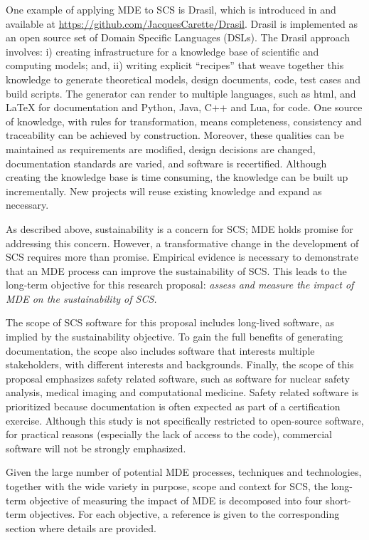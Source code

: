\documentclass[12pt]{article}
\begin{document}
One example of applying MDE to SCS is Drasil, which is introduced in
\citet{SzymczakEtAl2016} and available at
\href{https://github.com/JacquesCarette/Drasil}
{https://github.com/JacquesCarette/Drasil}.  Drasil is implemented as an open
source set of Domain Specific Languages (DSLs).  The Drasil approach involves:
i) creating infrastructure for a knowledge base of scientific and computing
models; and, ii) writing explicit ``recipes'' that weave together this knowledge
to generate theoretical models, design documents, code, test cases and build
scripts. The generator can render to multiple languages, such as html, and LaTeX
for documentation and Python, Java, C++ and Lua, for code. One source of
knowledge, with rules for transformation, means completeness, consistency and
traceability can be achieved by construction. Moreover, these qualities can be
maintained as requirements are modified, design decisions are changed,
documentation standards are varied, and software is re­certified.  Although
creating the knowledge base is time consuming, the knowledge can be built up
incrementally.  New projects will reuse existing knowledge and expand as
necessary.

As described above, sustainability is a concern for SCS; MDE holds promise
for addressing this concern.  However, a transformative change in the
development of SCS requires more than promise.  Empirical evidence is necessary
to demonstrate that an MDE process can improve the sustainability of SCS.  This
leads to the long-term objective for this research proposal: \emph{assess and
  measure the impact of MDE on the sustainability of SCS.}

The scope of SCS software for this proposal includes long-lived software, as
implied by the sustainability objective.  To gain the full benefits of
generating documentation, the scope also includes software that interests
multiple stakeholders, with different interests and backgrounds.  Finally, the
scope of this proposal emphasizes safety related software, such as software for
nuclear safety analysis, medical imaging and computational medicine.  Safety
related software is prioritized because documentation is often expected as part
of a certification exercise.  Although this study is not specifically restricted
to open-source software, for practical reasons (especially the lack of access to
the code), commercial software will not be strongly emphasized.

Given the large number of potential MDE processes, techniques and technologies,
together with the wide variety in purpose, scope and context for SCS, the
long-term objective of measuring the impact of MDE is decomposed into four
short-term objectives.  For each objective, a reference is given to the
corresponding section where details are provided.
\end{document}
